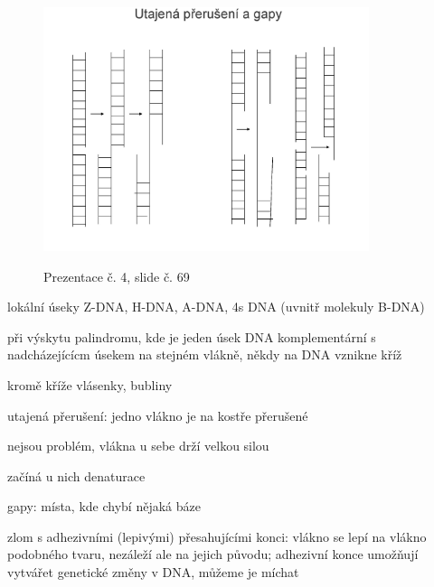 \documentclass[DIV=8]{scrreprt}
\begin{document}
\begin{figure}
    \caption{Prezentace č. 4, slide č. 69}
    \includegraphics[width=0.85\textwidth]{slides-4/slide-69.jpg}
    \centering
    \label{slides-4-slide-69}
\end{figure}

\begin{myItemize}[nosep]
    \item lokální úseky Z-DNA, H-DNA, A-DNA, 4s DNA (uvnitř molekuly B-DNA)
    \item při výskytu palindromu, kde je jeden úsek DNA komplementární s nadcházejícícm úsekem na stejném vlákně, někdy na DNA vznikne kříž
    \item kromě kříže vlásenky, bubliny
    \item utajená přerušení: jedno vlákno je na kostře přerušené
\begin{myItemize}[nosep]
    \item nejsou problém, vlákna u sebe drží velkou silou
    \item začíná u nich denaturace
\end{myItemize}

    \item gapy: místa, kde chybí nějaká báze
    \item zlom s adhezivními (lepivými) přesahujícími konci: vlákno se lepí na vlákno podobného tvaru, nezáleží ale na jejich původu; adhezivní konce umožňují vytvářet genetické změny v DNA, můžeme je míchat
\end{myItemize}
\end{document}
